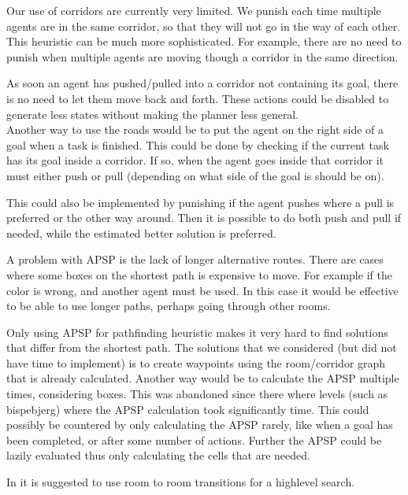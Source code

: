 \documentclass[letterpaper]{article}
\begin{document}

Our use of corridors are currently very limited. We punish each time multiple agents
are in the same corridor, so that they will not go in the way of each other. This
heuristic can be much more sophisticated. For example, there are no need to punish
when multiple agents are moving though a corridor in the same direction.

As soon an agent has pushed/pulled into a corridor not containing its goal, there
is no need to let them move back and forth. These actions could be disabled to
generate less states without making the planner less general.\\

Another way to use the roads would be to put the agent on the right side of
a goal when a task is finished. This could be done by checking if the current task
has its goal inside a corridor. If so, when the agent goes inside that corridor
it must either push or pull (depending on what side of the goal is should be on).

This could also be implemented by punishing if the agent pushes where a pull is
preferred or the other way around. Then it is possible to do both push and pull
if needed, while the estimated better solution is preferred.

A problem with APSP is the lack of longer alternative routes. There are cases
where some boxes on the shortest path is expensive to move. For example if
the color is wrong, and another agent must be used. In this case it would be
effective to be able to use longer paths, perhaps going through other rooms.

Only using APSP for pathfinding heuristic makes it very hard to find solutions
that differ from the shortest path. The solutions that we considered (but did not
have time to implement) is to create waypoints using the room/corridor graph
that is already calculated. Another way would be to calculate the APSP multiple
times, considering boxes. This was abandoned since there where levels (such as bispebjerg)
where the APSP calculation took significantly time. This could possibly be countered
by only calculating the APSP rarely, like when a goal has been completed, or
after some number of actions. Further the APSP could be lazily evaluated thus
only calculating the cells that are needed.

In \cite{sokobanMA} it is suggested to use room to room transitions for
a highlevel search.\\
\end{document}
